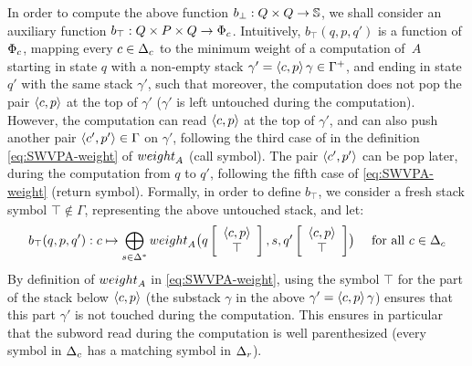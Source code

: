 \noindent
In order to compute the above function $b_\bot : Q \times Q \to \mathbb{S}$,
we shall consider an auxiliary function $b_\top :  Q \times P \times Q \to \Phic$.
%
Intuitively, $b_\top(q, p, q')$ is a function of $\Phic$,
mapping every $c \in \Deltac$ to
the minimum weight of a computation of~$A$
starting in state $q$ with a non-empty stack
$\gamma' = \<c, p> \, \gamma \in \Gamma^+$,
and ending in state $q'$ with the same stack $\gamma'$,
such that moreover,
the computation does not pop the pair $\<c, p>$ at the top of $\gamma'$
(\ie $\gamma'$ is left untouched during the computation).
However, the computation can read $\<c, p>$ at the top of $\gamma'$,
and can also push another pair $\< c', p'> \in \Gamma$ on $\gamma'$,
following the third case of
in the definition \eqref{eq:SWVPA-weight} of $\weight_A$ (call symbol).
The pair $\< c', p'>$ can be pop later, during the computation from $q$ to $q'$,
following the fifth case of \eqref{eq:SWVPA-weight} (return symbol).
%
%
Formally, in order to define $b_\top$, we consider
a fresh stack symbol $\top \notin \Gamma$,   %
representing the above untouched stack, and let:
%
\begin{equation}\label{eq:btop}
  b_\top(q, p, q') : c \mapsto \bigoplus_{s\in \Delta^*}
  \textstyle
  \weight_A\bigl(\configup{q}{\< c, p> \stackup \top }, s, \configup{q'}{\<c, p> \stackup \top}\bigr)
\quad
\mathrm{~for~all~} c \in \Deltac
\end{equation}
%
By definition of $\weight_A$ in \eqref{eq:SWVPA-weight},
using the symbol $\top$ for the part of the stack below $\<c, p>$
(\ie the substack $\gamma$ in the above $\gamma' = \<c, p> \, \gamma$)
ensures that this part $\gamma'$ is not touched during the computation.
%
This ensures in particular that the subword
read during the computation is well parenthesized
(every symbol in $\Deltac$ has a matching symbol in $\Deltar$).


